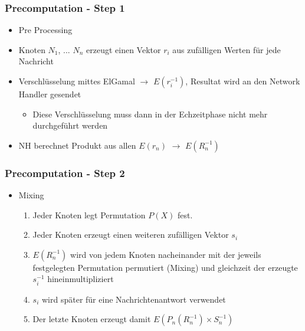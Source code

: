 \documentclass[t, xcolor=dvipsnames]{beamer}
\begin{document}
\begin{frame}
	\frametitle{Precomputation - Step 1}
	\begin{itemize}
				\item Pre Processing

				\item Knoten $N_1$, ... $N_n$ erzeugt einen Vektor $r_i$ aus zufälligen Werten für jede Nachricht

				\item Verschlüsselung mittes ElGamal $\rightarrow$ $E(r_i^{-1})$, Resultat wird an den Network Handler gesendet
				\begin{itemize}
					\item Diese Verschlüsselung muss dann in der Echzeitphase nicht mehr durchgeführt werden
				\end{itemize}
				\item NH berechnet Produkt aus allen $E(r_n)$ $\rightarrow$ $E(R_n^{-1})$  
		\end{itemize}
	\vspace{\fill}
\end{frame}

\begin{frame}
	\frametitle{Precomputation - Step 2}
	\begin{itemize}
				\item Mixing
				\begin{enumerate}
					\item Jeder Knoten legt Permutation $P(X)$ fest.
					\item Jeder Knoten erzeugt einen weiteren zufälligen Vektor $s_i$
					\item $E(R_n^{-1})$ wird von jedem Knoten nacheinander mit der jeweils festgelegten Permutation permutiert (Mixing) und gleichzeit der erzeugte $s_i^{-1}$ hineinmultipliziert
					\item $s_i$ wird später für eine Nachrichtenantwort verwendet
				\item Der letzte Knoten erzeugt damit $E(P_n(R_n^{-1}) \times S_n^{-1})$
				\end{enumerate}

	\end{itemize}
	\vspace{\fill}
\end{frame}
\end{document}
